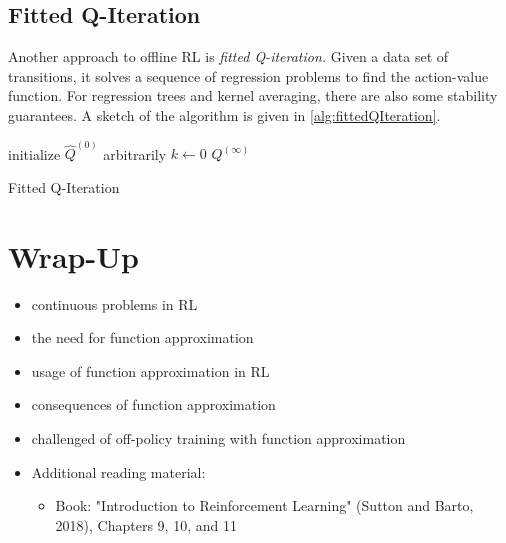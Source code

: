 		\subsection{Fitted Q-Iteration}
			Another approach to offline \ac{RL} is \emph{fitted Q-iteration.} Given a data set of transitions, it solves a sequence of regression problems to find the action-value function. For regression trees and kernel averaging, there are also some stability guarantees. A sketch of the algorithm is given in \autoref{alg:fittedQIteration}.

			\begin{algorithm}  \DontPrintSemicolon
				initialize \(\hat{Q}^{(0)}\) arbitrarily \;
				\( k \gets 0 \) \;
				\Return \(Q^{(\infty)}\) \;
				\caption{Fitted Q-Iteration}
				\label{alg:fittedQIteration}
			\end{algorithm}

	\section{Wrap-Up}
		\begin{itemize}
			\item continuous problems in \ac{RL}
			\item the need for function approximation
			\item usage of function approximation in \ac{RL}
			\item consequences of function approximation
			\item challenged of off-policy training with function approximation
			\item Additional reading material:
				\begin{itemize}
					\item Book: "Introduction to Reinforcement Learning" (Sutton and Barto, 2018), Chapters 9, 10, and 11  %
				\end{itemize}
		\end{itemize}

